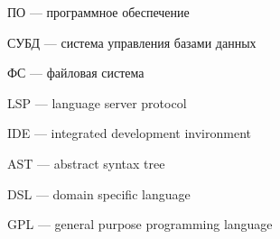 
\hypertarget{ПО}{ПО --- программное обеспечение}

\hypertarget{СУБД}{СУБД --- система управления базами данных}

\hypertarget{ПО}{ФС --- файловая система}

\hypertarget{LSP}{LSP --- language server protocol}

\hypertarget{IDE}{IDE --- integrated development invironment}

\hypertarget{AST}{AST --- abstract syntax tree}

\hypertarget{DSL}{DSL --- domain specific language}

\hypertarget{GPL}{GPL --- general purpose programming language}

\clearpage